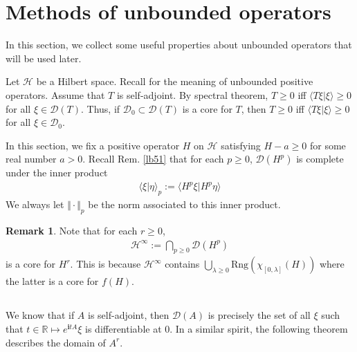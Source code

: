 \documentclass[12pt,b5paper,notitlepage]{article}
\theoremstyle{definition}
\newtheorem{rem}[df]{Remark}
\theoremstyle{plain}
\newcommand{\mc}{\mathcal}
\newcommand{\Dom}{\scr{D}}
\newcommand{\bk}[1]{\langle {#1}\rangle}
\newcommand{\scr}{\mathscr}
\newcommand{\im}{\mathbf{i}}
\newcommand{\Rbb}{\mathbb R}
\newcommand{\Rng}{\mathrm{Rng}}
\numberwithin{equation}{section}
\begin{document}
\newpage




\section{Methods of unbounded operators}


In this section, we collect some useful properties about unbounded operators that will be used later.

Let $\mc H$ be a Hilbert space. Recall \cite[Sec. 4]{Gui-S} for the meaning of unbounded positive operators. Assume that $T$ is self-adjoint. By spectral theorem, $T\geq0$ iff $\bk{T\xi|\xi}\geq0$ for all $\xi\in\Dom(T)$. Thus, if $\Dom_0\subset\Dom(T)$ is a core for $T$, then $T\geq0$ iff $\bk{T\xi|\xi}\geq0$ for all $\xi\in\Dom_0$.


In this section, we fix a positive operator $H$ on $\mc H$ satisfying $H-a\geq0$ for some real number $a>0$. Recall Rem. \ref{lb51} that for each $p\geq0$, $\Dom(H^p)$ is complete under the inner product
\begin{align}\label{eq57}
\bk{\xi|\eta}_p:=\bk{H^p\xi|H^p\eta}
\end{align}
We always let $\Vert\cdot\Vert_p$ be the norm associated to this inner product. 

\begin{rem}
Note that for each $r\geq0$,
\begin{align*}
\mc H^\infty:=\bigcap_{p\geq0} \Dom(H^p)
\end{align*}
is a core for $H^r$. This is because $\mc H^\infty$ contains $\bigcup_{\lambda\geq0}\Rng(\chi_{[0,\lambda]}(H))$ where the latter is a core for $f(H)$.
\end{rem}


\subsection{}

We know that if $A$ is self-adjoint, then $\Dom(A)$ is precisely the set of all $\xi$ such that $t\in\Rbb\mapsto e^{\im tA}\xi$ is differentiable at $0$. In a similar spirit, the following theorem describes the domain of $A^r$.
\end{document}
